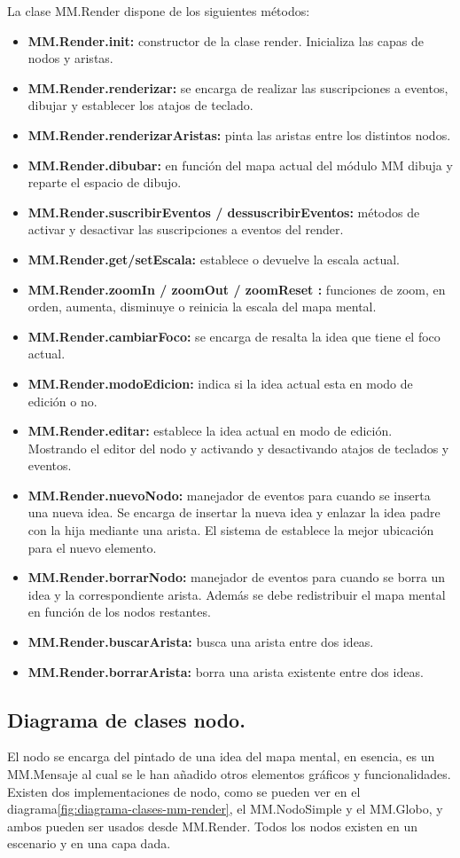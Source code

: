 La clase MM.Render dispone de los siguientes métodos: 
\begin{itemize}
\item \textbf{MM.Render.init:} constructor de la clase render. Inicializa las capas de nodos y aristas. 
\item \textbf{MM.Render.renderizar:} se encarga de realizar las suscripciones a eventos, dibujar y establecer los atajos de teclado.
\item \textbf{MM.Render.renderizarAristas:} pinta las aristas entre los distintos nodos.
\item \textbf{MM.Render.dibubar:} en función del mapa actual del módulo MM dibuja y reparte el espacio de dibujo.
\item \textbf{MM.Render.suscribirEventos / dessuscribirEventos:} métodos de activar y desactivar las suscripciones a eventos del render.  
\item \textbf{MM.Render.get/setEscala:} establece o devuelve la escala actual.
\item \textbf{MM.Render.zoomIn / zoomOut / zoomReset :} funciones de zoom, en orden, aumenta, disminuye o reinicia la escala del mapa mental.
\item \textbf{MM.Render.cambiarFoco:} se encarga de resalta la idea que tiene el foco actual.
\item \textbf{MM.Render.modoEdicion:} indica si la idea actual esta en modo de edición o no.
\item \textbf{MM.Render.editar:} establece la idea actual en modo de edición. Mostrando el editor del nodo y activando y desactivando atajos de teclados y eventos.
\item \textbf{MM.Render.nuevoNodo:} manejador de eventos para cuando se inserta una nueva idea. Se encarga de insertar la nueva idea y enlazar la idea padre con la hija mediante una arista. El sistema de establece la mejor ubicación para el nuevo elemento.
\item \textbf{MM.Render.borrarNodo:} manejador de eventos para cuando se borra un idea y la correspondiente arista. Además se debe redistribuir el mapa mental en función de los nodos restantes.
\item \textbf{MM.Render.buscarArista:} busca una arista entre dos ideas.
\item \textbf{MM.Render.borrarArista:} borra una arista existente entre dos ideas.
\end{itemize}



\subsection{Diagrama de clases nodo.}
El nodo se encarga del pintado de una idea del mapa mental, en esencia, es un MM.Mensaje al cual se le han añadido otros elementos gráficos y funcionalidades. Existen dos implementaciones de nodo, como se pueden ver en el diagrama\ref{fig:diagrama-clases-mm-render}, el MM.NodoSimple y el MM.Globo, y ambos pueden ser usados desde MM.Render. Todos los nodos existen en un escenario y en una capa dada. 

